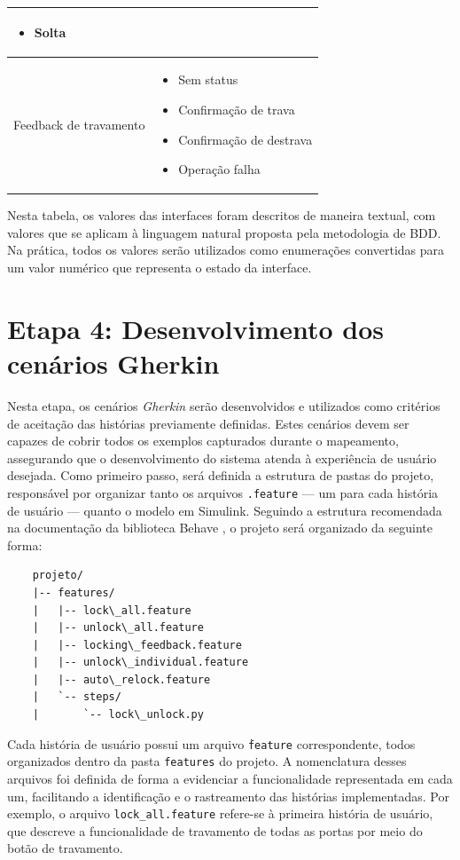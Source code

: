 \begin{quadro}[h]
\begin{tabular}{|p{5cm}|p{7cm}|}
\begin{itemize}[topsep=0pt, partopsep=0pt, leftmargin=*]
    \item Solta
\end{itemize} \\
\hline
Feedback de travamento &
\begin{itemize}[topsep=0pt, partopsep=0pt, leftmargin=*]
    \item Sem status
    \item Confirmação de trava
    \item Confirmação de destrava
    \item Operação falha
\end{itemize} \\
\hline
\end{tabular}
\end{quadro}

Nesta tabela, os valores das interfaces foram descritos de maneira textual, com valores que se aplicam à linguagem natural proposta pela metodologia de BDD. 
Na prática, todos os valores serão utilizados como enumerações convertidas para um valor numérico que representa o estado da interface.

\section{\textbf{Etapa 4: Desenvolvimento dos cenários Gherkin}}
\label{sbs:etapa4}
Nesta etapa, os cenários \textit{Gherkin} serão desenvolvidos e utilizados como critérios de aceitação das histórias previamente definidas. Estes cenários devem ser capazes 
de cobrir todos os exemplos capturados durante o mapeamento, assegurando que o desenvolvimento do sistema atenda à experiência de usuário desejada.
Como primeiro passo, será definida a estrutura de pastas do projeto, responsável por organizar tanto os arquivos \texttt{.feature} — um para cada história de usuário — 
quanto o modelo em Simulink. Seguindo a estrutura recomendada na documentação da biblioteca Behave \cite{behaveDocs}, o projeto será organizado da seguinte forma:

\begin{verbatim}
    projeto/
    |-- features/
    |   |-- lock\_all.feature
    |   |-- unlock\_all.feature
    |   |-- locking\_feedback.feature
    |   |-- unlock\_individual.feature
    |   |-- auto\_relock.feature
    |   `-- steps/
    |       `-- lock\_unlock.py
\end{verbatim}

Cada história de usuário possui um arquivo \texttt{\.feature} correspondente, todos organizados dentro da pasta \texttt{features} do projeto. A nomenclatura desses 
arquivos foi definida de forma a evidenciar a funcionalidade representada em cada um, facilitando a identificação e o rastreamento das histórias implementadas. 
Por exemplo, o arquivo \texttt{lock\_all.feature} refere-se à primeira história de usuário, que descreve a funcionalidade de travamento de todas as portas 
por meio do botão de travamento.

